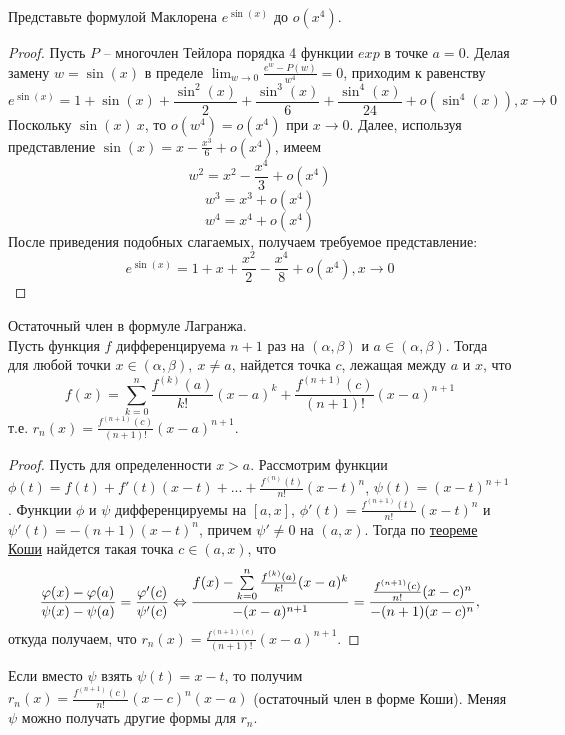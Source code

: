 \begin{example}
    Представьте формулой Маклорена $e^{\sin(x)}$ до $o(x^{4})$.
\end{example}

\begin{proof}
    Пусть $P$ -- многочлен Тейлора порядка 4 функции $exp$ в точке $a = 0$. Делая замену $w = \sin(x)$ в пределе $\lim_{w \to 0}\frac{e^{w} - P(w)}{w^{4}} = 0$, приходим к равенству
    \[e^{\sin(x)} = 1 + \sin(x) + \frac{\sin^{2}(x)}{2} + \frac{\sin^{3}(x)}{6} + \frac{\sin^{4}(x)}{24} + o(\sin^{4}(x)), x \to 0\]
    Поскольку $\sin(x) ~ x$, то $o(w^{4}) = o(x^{4})$ при $x \to 0$. Далее, используя представление $\sin(x) = x - \frac{x^{3}}{6} + o(x^{4})$, имеем
    \[w^{2} = x^{2} - \frac{x^{4}}{3} + o(x^{4})\]
    \[w^{3} = x^{3} + o(x^{4})\]
    \[w^{4} = x^{4} + o(x^{4})\]
    После приведения подобных слагаемых, получаем требуемое представление:
    \[e^{\sin(x)} = 1 + x + \frac{x^{2}}{2} - \frac{x^{4}}{8} + o(x^{4}), x \to 0\]
\end{proof}

\begin{theorem} {Остаточный член в формуле Лагранжа.}\\
    Пусть функция $f$ дифференцируема $n+1$ раз на $(\alpha , \beta)$ и $a \in (\alpha, \beta)$. Тогда для любой точки $x \in (\alpha, \beta),\ x \neq a$, найдется точка $c$, лежащая между $a$ и $x$, что
    \[f(x) = \sum_{k = 0}^{n}\frac{f^{(k)}(a)}{k!}(x-a)^{k} + \frac{f^{(n+1)}(c)}{(n+1)!}(x-a)^{n+1}\]
    т.е. $r_{n}(x) = \frac{f^{(n+1)}(c)}{(n+1)!}(x-a)^{n+1}$.
\end{theorem}

\begin{proof}
    Пусть для определенности $x > a$. Рассмотрим функции $\phi (t) = f(t) + f'(t)(x-t) + ... + \frac{f^{(n)}(t)}{n!}(x-t)^{n}$, $\psi (t) = (x-t)^{n+1}$. Функции $\phi$ и $\psi$ дифференцируемы на $[a,x]$, $\phi'(t) = \frac{f^{(n+1)}(t)}{n!}(x - t)^{n}$ и $\psi'(t) = -(n+1)(x-t)^{n}$, причем $\psi' \neq 0$ на $(a, x)$. Тогда по \hyperlink{koshi_o_srednem}{теореме Коши} найдется такая точка $c \in (a,x)$, что
    \[\frac{\varphi(x) - \varphi(a)}{\psi(x) - \psi(a)} = \frac{\varphi'(c)}{\psi'(c)} \Leftrightarrow \frac{f(x) - \sum\limits_{k=0}^{n}\frac{f^{(k)}(a)}{k!}(x-a)^{k}}{-(x-a)^{n+1}} = \frac{\frac{f^{(n+1)}(c)}{n!}(x - c)^{n}}{-(n+1)(x-c)^{n}},\]
    откуда получаем, что $r_{n}(x) = \frac{f^{(n+1)(c)}}{(n+1)!}(x-a)^{n+1}$.
\end{proof}

\begin{note}
    Если вместо $\psi$ взять $\psi(t) = x - t$, то получим $r_{n}(x) = \frac{f^{(n+1)}(c)}{n!}(x-c)^{n}(x-a)$ (остаточный член в форме Коши). Меняя $\psi$ можно получать другие формы для $r_{n}$.
\end{note}

